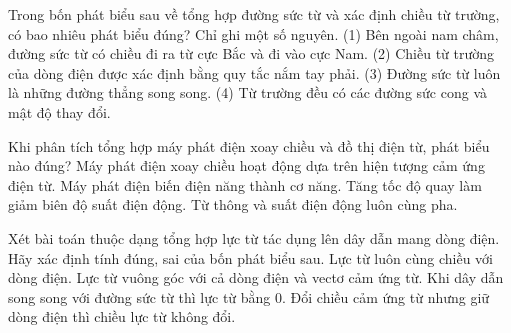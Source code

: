 \begin{ex}
Trong bốn phát biểu sau về tổng hợp đường sức từ và xác định chiều từ trường, có bao nhiêu phát biểu đúng? Chỉ ghi một số nguyên. (1) Bên ngoài nam châm, đường sức từ có chiều đi ra từ cực Bắc và đi vào cực Nam. (2) Chiều từ trường của dòng điện được xác định bằng quy tắc nắm tay phải. (3) Đường sức từ luôn là những đường thẳng song song. (4) Từ trường đều có các đường sức cong và mật độ thay đổi.
\end{ex}

\begin{ex}
Khi phân tích tổng hợp máy phát điện xoay chiều và đồ thị điện từ, phát biểu nào đúng?
\choice
{\True Máy phát điện xoay chiều hoạt động dựa trên hiện tượng cảm ứng điện từ.}
{Máy phát điện biến điện năng thành cơ năng.}
{Tăng tốc độ quay làm giảm biên độ suất điện động.}
{Từ thông và suất điện động luôn cùng pha.}
\end{ex}

\begin{ex}
Xét bài toán thuộc dạng tổng hợp lực từ tác dụng lên dây dẫn mang dòng điện. Hãy xác định tính đúng, sai của bốn phát biểu sau.
\choiceTF
{Lực từ luôn cùng chiều với dòng điện.}
{\True Lực từ vuông góc với cả dòng điện và vectơ cảm ứng từ.}
{\True Khi dây dẫn song song với đường sức từ thì lực từ bằng 0.}
{Đổi chiều cảm ứng từ nhưng giữ dòng điện thì chiều lực từ không đổi.}
\end{ex}

